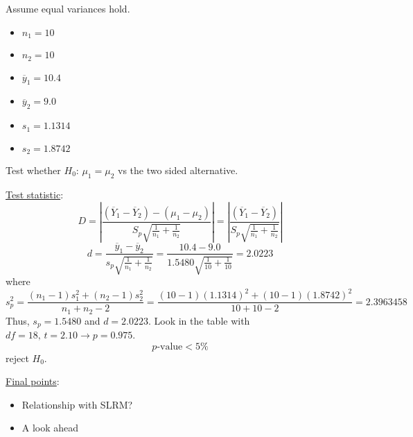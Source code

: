 \begin{exbox}
    \begin{example} Assume equal variances hold.
        \begin{itemize}
            \item $ n_1=10 $
            \item $ n_2=10 $
            \item $ \overline{y}_1=10.4 $
            \item $ \overline{y}_2=9.0 $
            \item $ s_1=1.1314 $
            \item $ s_2=1.8742 $
        \end{itemize}
        Test whether $ H_0 $: $ \mu_1=\mu_2 $ vs the two sided alternative.

        \underline{Test statistic}:
        \[ D=\left|\frac{(\overline{Y}_1-\overline{Y}_2)-(\mu_1-\mu_2)}{S_p\sqrt{\frac{1}{n_1}+\frac{1}{n_2}}}\right|=
            \left|\frac{(\overline{Y}_1-\overline{Y}_2)}{S_p\sqrt{\frac{1}{n_1}+\frac{1}{n_2}}}\right| \]
        \[ d=\frac{\overline{y}_1-\overline{y}_2}{s_p\sqrt{\frac{1}{n_1}+\frac{1}{n_2}}}=
            \frac{10.4-9.0}{1.5480\sqrt{\frac{1}{10}+\frac{1}{10}}}=2.0223  \]
        where
        \[ s_p^2=\frac{(n_1-1)s_1^2+(n_2-1)s_2^2}{n_1+n_2-2}=\frac{(10-1)(1.1314)^2+(10-1)(1.8742)^2}{10+10-2}=2.3963458  \]
        Thus, $ s_p=1.5480 $ and $ d=2.0223 $. Look in the table with $ df=18,\,t=2.10 \rightarrow
            p=0.975$.
        \[ p\text{-value}<5\% \]
        reject $ H_0 $.
    \end{example}
\end{exbox}

\underline{Final points}:
\begin{itemize}
    \item Relationship with SLRM?
    \item A look ahead
\end{itemize}
